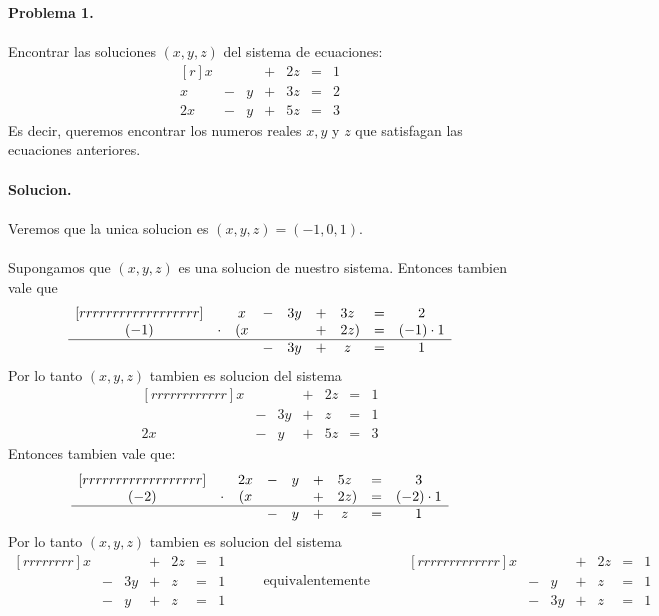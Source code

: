 \documentclass{article}
\theoremstyle{definition}
\theoremstyle{definition}
\theoremstyle{remark}
\begin{document}
\textbf{Problema 1.}\\\\
Encontrar las soluciones $(x,y,z)$ del sistema de ecuaciones:
\[
  \begin{matrix*}[r]
    x & & & + & 2z & = & 1\\
    x & - & y & + & 3z & = & 2 \\
    2x & - & y & + & 5z & = & 3
  \end{matrix*}
\]
Es decir, queremos encontrar los numeros reales $x,y$ y $z$ que satisfagan las ecuaciones anteriores.
\\\\
\textbf{Solucion.}\\\\
Veremos que la unica solucion es $(x,y,z)=(-1,0,1)$.
\\\\
Supongamos que $(x,y,z)$ es una solucion de nuestro sistema. Entonces tambien vale que\[
  \begin{matrix}[rrrrrrrrrrrrrrrrrr]
&& x & - & 3y & + & 3z\phantom{)} & = & 2 \\
    (-1) & \cdot &(x & & & + & 2z ) & = & (-1) \cdot 1 \\
    \hline 
         & & & - & 3y & + & z\phantom{)} & = & 1
  \end{matrix}
\]
Por lo tanto $(x,y,z)$ tambien es solucion del sistema \[
  \begin{matrix}[rrrrrrrrrrrr]
    x & & & +  & 2z & = & 1 \\
      & - & 3y & + & z & = & 1 \\
    2x & - & y & + & 5z & = & 3
  \end{matrix}
\]
Entonces tambien vale que: \[
  \begin{matrix}[rrrrrrrrrrrrrrrrrr]
&& 2x & - & y & + & 5z\phantom{)} & = & 3 \\
    (-2) & \cdot &(x & & & + & 2z ) & = & (-2) \cdot 1 \\
    \hline 
         & & & - & y & + & z\phantom{)} & = & 1
  \end{matrix}
\]
Por lo tanto $(x,y,z)$ tambien es solucion del sistema \[
  \begin{matrix}[rrrrrrrr]
    x & & & + & 2z & = & 1 \\
      & - & 3y & + & z & = & 1 \\
      & - & y & + & z & = & 1
    \end{matrix} \quad \quad \text{ equivalentemente } \quad \quad \begin{matrix}[rrrrrrrrrrrrr]
    x & & & +  & 2z & = & 1 \\
      & - & y & + & z &= & 1 \\
      & - & 3y & + & z & = & 1 
  \end{matrix}
\]
\end{document}
